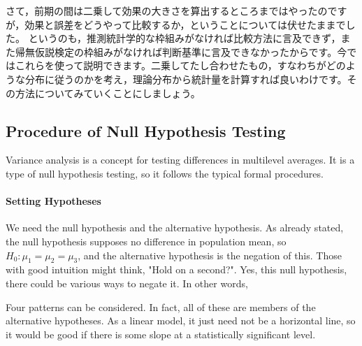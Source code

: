 \documentclass{ltjbook}
\begin{document}
さて，前期の間は二乗して効果の大きさを算出するところまではやったのですが，効果と誤差をどうやって比較するか，ということについては伏せたままでした。
というのも，推測統計学的な枠組みがなければ比較方法に言及できず，また帰無仮説検定の枠組みがなければ判断基準に言及できなかったからです。今ではこれらを使って説明できます。二乗してたし合わせたもの，すなわちがどのような分布に従うのかを考え，理論分布から統計量を計算すれば良いわけです。その方法についてみていくことにしましょう。

\subsection{Procedure of Null Hypothesis Testing}
Variance analysis is a concept for testing differences in multilevel averages. It is a type of null hypothesis testing, so it follows the typical formal procedures.

\paragraph{Setting Hypotheses}
We need the null hypothesis and the alternative hypothesis. As already stated, the null hypothesis supposes no difference in population mean, so $H_0 : \mu_1 = \mu_2 = \mu_3$, and the alternative hypothesis is the negation of this. Those with good intuition might think, "Hold on a second?". Yes, this null hypothesis, there could be various ways to negate it. In other words,



Four patterns can be considered. In fact, all of these are members of the alternative hypotheses. As a linear model, it just need not be a horizontal line, so it would be good if there is some slope at a statistically significant level.
\end{document}
